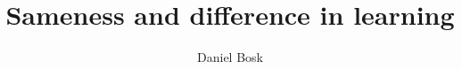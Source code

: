 \documentclass{article}
\begin{document}
\title{%
  Sameness and difference in learning
}
\author{Daniel Bosk}

\maketitle

\begin{abstract}
  
\end{abstract}



\printbibliography
\end{document}
